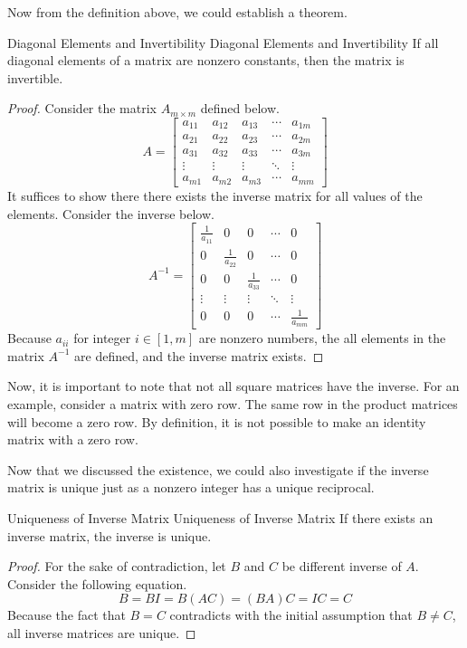 \documentclass[../main.tex]{subfiles}
\begin{document}
Now from the definition above, we could establish a theorem.

\begin{theorem}{Diagonal Elements and Invertibility}
{Diagonal Elements and Invertibility}
If all diagonal elements of a matrix are nonzero constants,
then the matrix is invertible.
\end{theorem}
\begin{proof}
Consider the matrix $A_{m \times m}$ defined below.
\[
A =
\begin{bmatrix}
    a_{11} & a_{12} & a_{13} & \cdots & a_{1m} \\
    a_{21} & a_{22} & a_{23} & \cdots & a_{2m} \\
    a_{31} & a_{32} & a_{33} & \cdots & a_{3m} \\
    \vdots & \vdots & \vdots & \ddots & \vdots \\
    a_{m1} & a_{m2} & a_{m3} & \cdots & a_{mm}
\end{bmatrix}
\]
It suffices to show there there exists the inverse matrix
for all values of the elements. Consider the inverse below.
\[
A^{-1} =
\begin{bmatrix}
    \frac{1}{a_{11}} & 0 & 0 & \cdots & 0 \\
    0 & \frac{1}{a_{22}} & 0 & \cdots & 0 \\
    0 & 0 & \frac{1}{a_{33}} & \cdots & 0 \\
    \vdots & \vdots & \vdots & \ddots & \vdots \\
    0 & 0 & 0 & \cdots & \frac{1}{a_{mm}}
\end{bmatrix}
\]
Because $a_{ii}$ for integer $i \in [1, m]$ are nonzero numbers,
the all elements in the matrix $A^{-1}$ are defined, and the
inverse matrix exists.
\end{proof}

Now, it is important to note that not all square matrices have the
inverse. For an example, consider a matrix with zero row. The same
row in the product matrices will become a zero row. By definition,
it is not possible to make an identity matrix with a zero row.

Now that we discussed the existence, we could also investigate if
the inverse matrix is unique just as a nonzero integer has a unique
reciprocal.

\begin{theorem}{Uniqueness of Inverse Matrix}
{Uniqueness of Inverse Matrix}
If there exists an inverse matrix, the inverse is unique.
\end{theorem}
\begin{proof}
For the sake of contradiction, let $B$ and $C$ be different
inverse of $A$. Consider the following equation.
\[
B = BI = B(AC) = (BA)C = IC = C
\]
Because the fact that $B = C$ contradicts with the initial assumption
that $B \neq C$, all inverse matrices are unique.
\end{proof}
\end{document}
